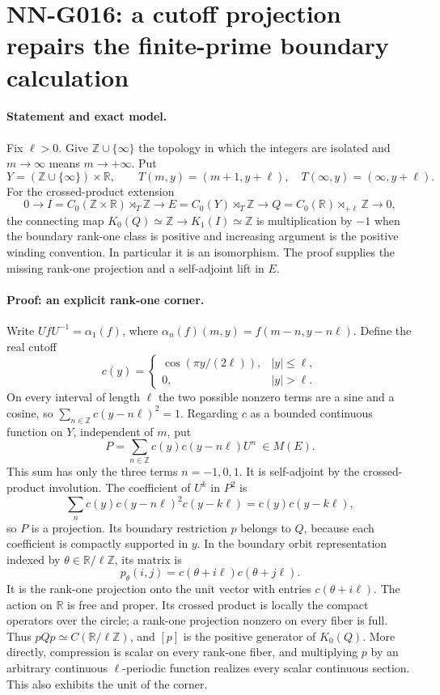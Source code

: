 \section{NN-G016: a cutoff projection repairs the finite-prime boundary calculation}
\paragraph{Statement and exact model.}
Fix $\ell>0$. Give $\mathbb Z\cup\{\infty\}$ the topology
in which the integers are isolated and $m\to\infty$ means
$m\to+\infty$. Put
\[
Y=(\mathbb Z\cup\{\infty\})\times\mathbb R,
\qquad T(m,y)=(m+1,y+\ell),\quad
T(\infty,y)=(\infty,y+\ell).
\]
For the crossed-product extension
\[
0\longrightarrow I=C_0(\mathbb Z\times\mathbb R)\rtimes_T\mathbb Z
\longrightarrow E=C_0(Y)\rtimes_T\mathbb Z
\longrightarrow Q=C_0(\mathbb R)\rtimes_{+\ell}\mathbb Z
\longrightarrow0,
\]
the connecting map $K_0(Q)\simeq\mathbb Z\to K_1(I)\simeq\mathbb Z$
is multiplication by $-1$ when the boundary rank-one class
is positive and increasing argument is the positive winding convention.
In particular it is an isomorphism. The proof supplies the
missing rank-one projection and a self-adjoint lift in $E$.

\paragraph{Proof: an explicit rank-one corner.}
Write $UfU^{-1}=\alpha_1(f)$, where
$\alpha_n(f)(m,y)=f(m-n,y-n\ell)$. Define the real cutoff
\[
c(y)=\begin{cases}\cos(\pi y/(2\ell)),& |y|\le\ell,\\0,&|y|>\ell.\end{cases}
\]
On every interval of length $\ell$ the two possible nonzero
terms are a sine and a cosine, so
$\sum_{n\in\mathbb Z}c(y-n\ell)^2=1$. Regarding $c$ as a
bounded continuous function on $Y$, independent of $m$, put
\[
P=\sum_{n\in\mathbb Z}c(y)c(y-n\ell)U^n\ \in M(E).
\]
This sum has only the three terms $n=-1,0,1$. It is
self-adjoint by the crossed-product involution. The coefficient
of $U^k$ in $P^2$ is
\[
\sum_n c(y)c(y-n\ell)^2c(y-k\ell)
=c(y)c(y-k\ell),
\]
so $P$ is a projection. Its boundary restriction $p$ belongs
to $Q$, because each coefficient is compactly supported in $y$.
In the boundary orbit representation indexed by
$\theta\in\mathbb R/\ell\mathbb Z$, its matrix is
\[
p_\theta(i,j)=c(\theta+i\ell)c(\theta+j\ell).
\]
It is the rank-one projection onto the unit vector with
entries $c(\theta+i\ell)$. The action on $\mathbb R$ is free
and proper. Its crossed product is locally the compact operators
over the circle; a rank-one projection nonzero on every fiber is
full. Thus $pQp\simeq C(\mathbb R/\ell\mathbb Z)$, and $[p]$
is the positive generator of $K_0(Q)$. More directly, compression
is scalar on every rank-one fiber, and multiplying $p$ by an
arbitrary continuous $\ell$-periodic function realizes every
scalar continuous section. This also exhibits the unit of the corner.


